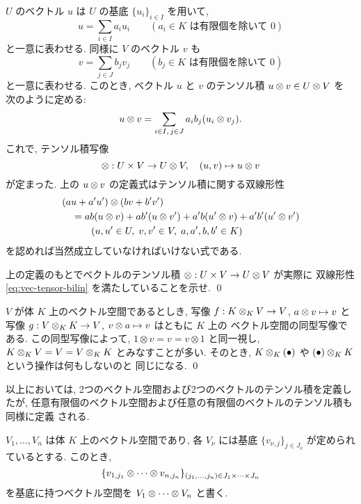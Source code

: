 \documentclass[12pt,twoside]{jarticle}
\begin{document}
$U$ のベクトル $u$ は $U$ の基底 $\{u_i\}_{i\in I}$ を用いて,
\begin{equation*}
  u = \sum_{i\in I} a_i u_i
  \qquad
  (\text{$a_i\in K$ は有限個を除いて $0$})
\end{equation*}
と一意に表わせる. 同様に $V$ のベクトル $v$ も 
\begin{equation*}
  v = \sum_{j\in J} b_j v_j
  \qquad
  (\text{$b_j\in K$ は有限個を除いて $0$})
\end{equation*}
と一意に表わせる. 
このとき, ベクトル $u$ と $v$ のテンソル積 $u\otimes v\in U\otimes V$ を
次のように定める: 
\begin{equation*}
  u\otimes v = \sum_{i\in I,\,j\in J} a_i b_j (u_i\otimes v_j).
\end{equation*}
これで, テンソル積写像
\begin{equation*}
  \otimes : U \times V \to U\otimes V,\quad (u,v)\mapsto u\otimes v
\end{equation*}
が定まった. 上の $u\otimes v$ の定義式はテンソル積に関する双線形性
\begin{align}
  &
  (au + a'u')\otimes (bv + b'v') 
  \notag \\
  & \quad = ab(u\otimes v) + ab'(u\otimes v') + a'b(u'\otimes v) + a'b'(u'\otimes v')
  \label{eq:vec-tensor-bilin}
  \\
  & \qquad\quad (u,u'\in U,\; v,v'\in V,\; a,a',b,b'\in K)
  \notag 
\end{align}
を認めれば当然成立していなければいけない式である. 

\begin{question}
  上の定義のもとでベクトルのテンソル積 $\otimes: U \times V \to U\otimes V$ が実際に
  双線形性 \eqref{eq:vec-tensor-bilin} を満たしていることを示せ. 
  \qed
\end{question}

\begin{question}
  $V$ が体 $K$ 上のベクトル空間であるとしき,
  写像 $f: K\otimes_K V\to V$, $a\otimes v\mapsto v$ と
  写像 $g: V\otimes_K K\to V$, $v\otimes a\mapsto v$ はともに $K$ 上の
  ベクトル空間の同型写像である.
  この同型写像によって, $1\otimes v = v = v\otimes 1$ と同一視し,
  $K\otimes_K V = V = V\otimes_K K$ とみなすことが多い. 
  そのとき, $K\otimes_K(\bullet)$ や $(\bullet)\otimes_K K$ という操作は何もしないのと
  同じになる.
  \qed
\end{question}

以上においては, 2つのベクトル空間および2つのベクトルのテンソル積を定義したが,
任意有限個のベクトル空間および任意の有限個のベクトルのテンソル積も同様に定義
される.

$V_1,\ldots,V_n$ は体 $K$ 上のベクトル空間であり,
各 $V_\nu$ には基底 $\{v_{\nu,j}\}_{j\in J_\nu}$ が定められているとする.
このとき, 
\begin{equation*}
  \{v_{1,j_1}\otimes\cdots\otimes v_{n,j_n}\}
  _{(j_1,\ldots,j_n)\in J_1\times\cdots\times J_n}
\end{equation*}
を基底に持つベクトル空間を $V_1\otimes\cdots\otimes V_n$ と書く.
\end{document}
